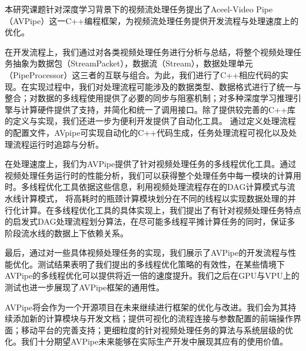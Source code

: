 
\begin{summary}
本研究课题针对深度学习背景下的视频流处理任务提出了Aceel-Video Pipe（AVPipe）这一C++编程框架，为视频流处理任务提供开发流程与处理速度上的优化。\par
在开发流程上，我们通过对各类视频处理任务进行分析与总结，将整个视频处理任务抽象为数据包（StreamPacket），数据流（Stream），数据处理单元（PipeProcessor）这三者的互联与组合。为此，我们进行了C++相应代码的实现。在实现过程中，我们对处理流程可能涉及的数据类型、数据格式进行了统一与整合；对数据的多线程使用提供了必要的同步与阻塞机制；对多种深度学习推理引擎与计算硬件提供了支持，并简化和统一了调用接口。除了提供较完善的C++库的定义与实现，我们还进一步为便利开发提供了自动化工具。
通过定义处理流程的配置文件，AVpipe可实现自动化的C++代码生成，任务处理流程可视化以及处理流程运行时追踪与分析。\par

在处理速度上，我们为AVPipe提供了针对视频处理任务的多线程优化工具。通过视频处理任务运行时的性能分析，我们可以获得整个处理任务中每一模块的计算用时。多线程优化工具依据这些信息，利用视频处理流程存在的DAG计算模式与流水线计算模式， 将高耗时的瓶颈计算模块划分在不同的线程以实现数据处理的并行化计算。在多线程优化工具的具体实现上，我们提出了有针对视频处理任务特点的启发式DAG处理流程划分算法，在尽可能多线程平摊计算任务的同时，保证多阶段流水线的数据上下依赖关系。\par

最后，通过对一些具体视频处理任务的实现，我们展示了AVPipe的开发流程与性能优化。测试结果表明了我们提出的多线程优化策略的有效性，在某些情境下AVPipe的多线程优化可以提供将近一倍的速度提升。我们之后在GPU与VPU上的测试也进一步展现了AVPipe框架的通用性。\par

AVPipe将会作为一个开源项目在未来继续进行框架的优化与改进。我们会为其持续添加新的计算模块与开发文档；提供可视化的流程连接与参数配置的前端操作界面；移动平台的完善支持；更细粒度的针对视频处理任务的算法与系统层级的优化。我们十分期望AVPipe未来能够在实际生产开发中展现其应有的使用价值。
\end{summary}
